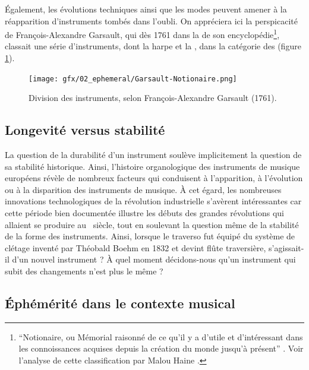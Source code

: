 \indent Également, les évolutions techniques ainsi que les modes peuvent amener à la réapparition d'instruments tombés dans l'oubli. On appréciera ici la perspicacité de François-Alexandre Garsault, qui dès 1761 dans la  de son encyclopédie\footnote{``Notionaire, ou Mémorial raisonné de ce qu'il y a d'utile et d'intéressant dans les connoissances acquises depuis la création du monde jusqu'à présent'' \cite{de_garsault_notionaire_1761}. Voir l'analyse de cette classification par Malou Haine \cite{haine_les_2018}.}, classait une série d'instruments, dont la harpe et la , dans la catégorie des (figure \ref{fig:ephemeral:Garsault}).

\begin{figure}[!htbp]
	\captionsetup{format=plain}%
	\texttt{[image: gfx/02\_ephemeral/Garsault-Notionaire.png]}
	\caption[Division des instruments, selon Garsault (1761)]{Division des instruments, selon François-Alexandre Garsault (1761).}
	\label{fig:ephemeral:Garsault}
\end{figure}

\subsection{Longevité versus stabilité}
\label{sec:ephemeral:longevity_stability}

\noindent La question de la durabilité d'un instrument soulève implicitement la question de sa stabilité historique. Ainsi, l'histoire organologique des instruments de musique européens révèle de nombreux facteurs qui conduisent à l'apparition, à l'évolution ou à la disparition des instruments de musique. À cet égard, les nombreuses innovations technologiques de la révolution industrielle s'avèrent intéressantes car cette période bien documentée illustre les débuts des grandes révolutions qui allaient se produire au ~siècle, tout en soulevant la question même de la stabilité de la forme des instruments. Ainsi, lorsque le traverso fut équipé du système de clétage inventé par Théobald Boehm en 1832 et devint flûte traversière, s'agissait-il d'un nouvel instrument ? À quel moment décidons-nous qu'un instrument qui subit des changements n'est plus le même ?

\subsection{Éphémérité dans le contexte musical}
\label{sec:ephemeral:ephemerality_in_musical_context}

